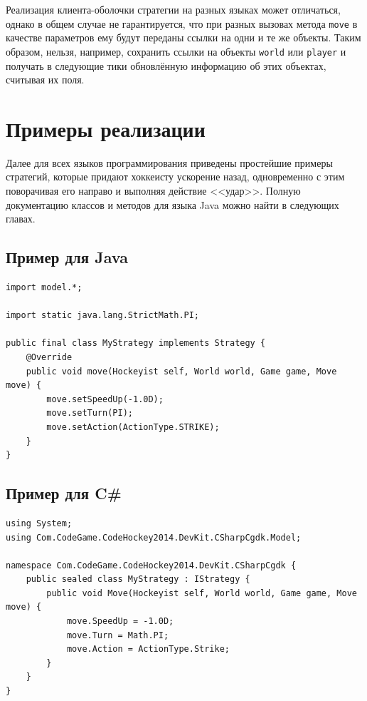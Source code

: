 Реализация клиента-оболочки стратегии на разных языках может отличаться, однако в общем случае не гарантируется, что при разных вызовах
метода \texttt{move} в качестве параметров ему будут переданы ссылки на одни и те же объекты. Таким образом, нельзя, например, сохранить
ссылки на объекты \texttt{world} или \texttt{player} и получать в следующие тики обновлённую информацию об этих объектах, считывая их поля.

\newpage
\section{Примеры реализации}

Далее для всех языков программирования приведены простейшие примеры стратегий, которые придают хоккеисту ускорение назад, одновременно с
этим поворачивая его направо и выполняя действие <<удар>>. Полную документацию классов и методов для языка Java можно найти в следующих
главах.

\subsection{Пример для Java}

\begin{verbatim}
import model.*;

import static java.lang.StrictMath.PI;

public final class MyStrategy implements Strategy {
    @Override
    public void move(Hockeyist self, World world, Game game, Move move) {
        move.setSpeedUp(-1.0D);
        move.setTurn(PI);
        move.setAction(ActionType.STRIKE);
    }
}
\end{verbatim}

\subsection{Пример для C\#}

\begin{verbatim}
using System;
using Com.CodeGame.CodeHockey2014.DevKit.CSharpCgdk.Model;

namespace Com.CodeGame.CodeHockey2014.DevKit.CSharpCgdk {
    public sealed class MyStrategy : IStrategy {
        public void Move(Hockeyist self, World world, Game game, Move move) {
            move.SpeedUp = -1.0D;
            move.Turn = Math.PI;
            move.Action = ActionType.Strike;
        }
    }
}
\end{verbatim}

\newpage

